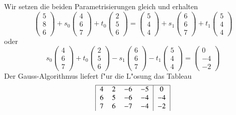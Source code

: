 \begin{beispiel}
{\parindent 0pt Wir setzen die beiden Parametrisierungen gleich und
erhalten}
\[
\begin{pmatrix}5\\8\\6\end{pmatrix}
+s_0\begin{pmatrix}4\\6\\7\end{pmatrix}
+t_0\begin{pmatrix}2\\5\\6\end{pmatrix}
=\begin{pmatrix}5\\4\\4\end{pmatrix}
+s_1\begin{pmatrix}6\\6\\7\end{pmatrix}
+t_1\begin{pmatrix}5\\4\\4\end{pmatrix}
\]
oder
\[
s_0\begin{pmatrix}4\\6\\7\end{pmatrix}
+t_0\begin{pmatrix}2\\5\\6\end{pmatrix}
-s_1\begin{pmatrix}6\\6\\7\end{pmatrix}
-t_1\begin{pmatrix}5\\4\\4\end{pmatrix}
=
\begin{pmatrix}0\\-4\\-2\end{pmatrix}
\]
Der Gauss-Algorithmus liefert f"ur die L"osung das Tableau
\[
\begin{tabular}{|>{$}c<{$}>{$}c<{$}>{$}c<{$}>{$}c<{$}|>{$}c<{$}|}
\hline
4&2&-6&-5& 0\\
6&5&-6&-4&-4\\
7&6&-7&-4&-2\\

\end{tabular}\]
\end{beispiel}
